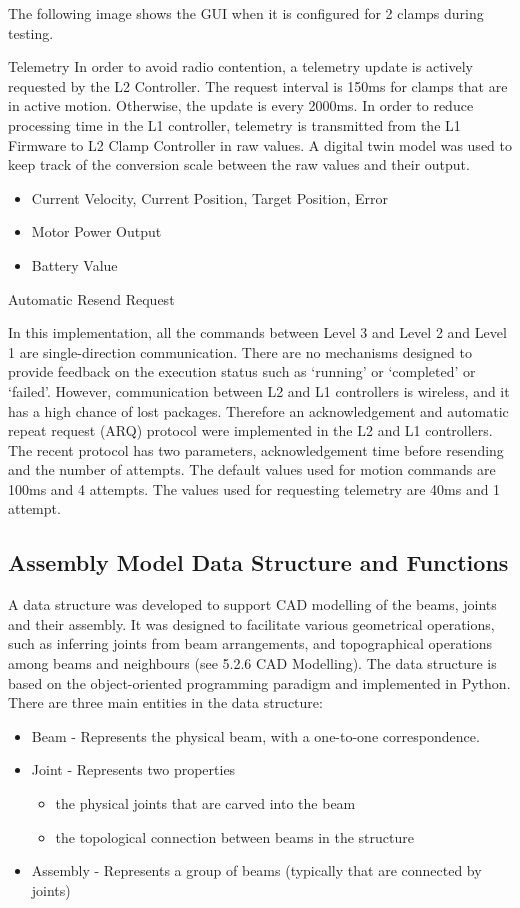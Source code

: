 \begin{itemize}
The following image shows the GUI when it is configured for 2 clamps during testing. 

Telemetry 
In order to avoid radio contention, a telemetry update is actively requested by the L2 Controller. The request interval is 150ms for clamps that are in active motion. Otherwise, the update is every 2000ms. 
In order to reduce processing time in the L1 controller, telemetry is transmitted from the L1 Firmware to L2 Clamp Controller in raw values. A digital twin model was used to keep track of the conversion scale between the raw values and their output.
\begin{itemize}
\item Current Velocity, Current Position, Target Position, Error
\item Motor Power Output
\item Battery Value 
\end{itemize}
Automatic Resend Request

In this implementation, all the commands between Level 3 and Level 2 and Level 1 are single-direction communication. There are no mechanisms designed to provide feedback on the execution status such as ‘running’ or ‘completed’ or ‘failed’. However, communication between L2 and L1 controllers is wireless, and it has a high chance of lost packages. Therefore an acknowledgement and automatic repeat request (ARQ) protocol were implemented in the L2 and L1 controllers. The recent protocol has two parameters, acknowledgement time before resending and the number of attempts. The default values used for motion commands are 100ms and 4 attempts. The values used for requesting telemetry are 40ms and 1 attempt. 

\subsection{Assembly Model Data Structure and Functions}
A data structure was developed to support CAD modelling of the beams, joints and their assembly. It was designed to facilitate various geometrical operations, such as inferring joints from beam arrangements, and topographical operations among beams and neighbours (see 5.2.6 CAD Modelling). The data structure is based on the object-oriented programming paradigm and implemented in Python. 
There are three main entities in the data structure:
\begin{itemize}
\item Beam - Represents the physical beam, with a one-to-one correspondence.
\item Joint - Represents two properties 
\begin{itemize}
    \item the physical joints that are carved into the beam
    \item the topological connection between beams in the structure
\end{itemize}
\item Assembly - Represents a group of beams (typically that are connected by joints)
\end{itemize}


\end{itemize}

